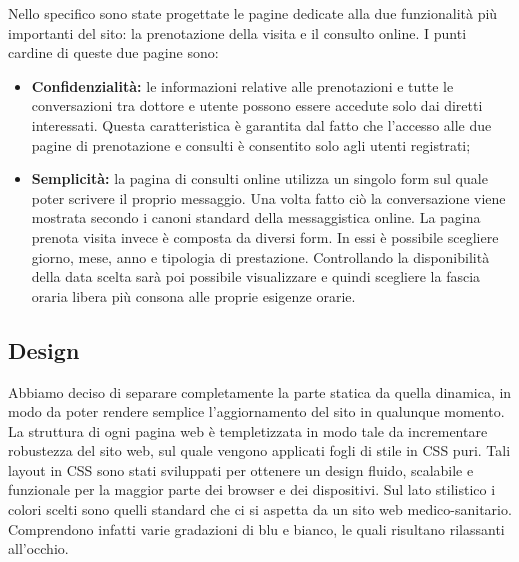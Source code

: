 Nello specifico sono state progettate le pagine dedicate alla due funzionalità più importanti del sito: la prenotazione della visita e il consulto online.
I punti cardine di queste due pagine sono:
\begin{itemize}
\item \textbf{Confidenzialità:} le informazioni relative alle prenotazioni e tutte le conversazioni tra dottore e utente possono essere accedute solo dai diretti interessati. Questa caratteristica è garantita dal fatto che l’accesso alle due pagine di prenotazione e consulti è consentito solo agli utenti registrati;


\item \textbf{Semplicità:} la pagina di consulti online utilizza un singolo form sul quale poter scrivere il proprio messaggio. Una volta fatto ciò la conversazione viene mostrata secondo i canoni standard della messaggistica online. La pagina prenota visita invece è composta da diversi form. In essi è possibile scegliere giorno, mese, anno e tipologia di prestazione. Controllando la disponibilità della data scelta sarà poi possibile visualizzare e quindi scegliere la fascia oraria libera più consona alle proprie esigenze orarie.


\end{itemize}


\subsection{Design}
Abbiamo deciso di separare completamente la parte statica da quella dinamica, in modo da poter rendere semplice l’aggiornamento del sito in qualunque momento.
La struttura di ogni pagina web è templetizzata in modo
tale da incrementare robustezza del sito web, sul quale vengono applicati fogli di stile in CSS puri.
Tali layout in CSS sono stati sviluppati per ottenere un design fluido, scalabile e funzionale per la maggior parte dei browser e dei dispositivi.
Sul lato stilistico i colori scelti sono quelli standard che ci si aspetta da un sito web medico-sanitario. Comprendono infatti varie gradazioni di blu e bianco, le quali risultano rilassanti all’occhio.

